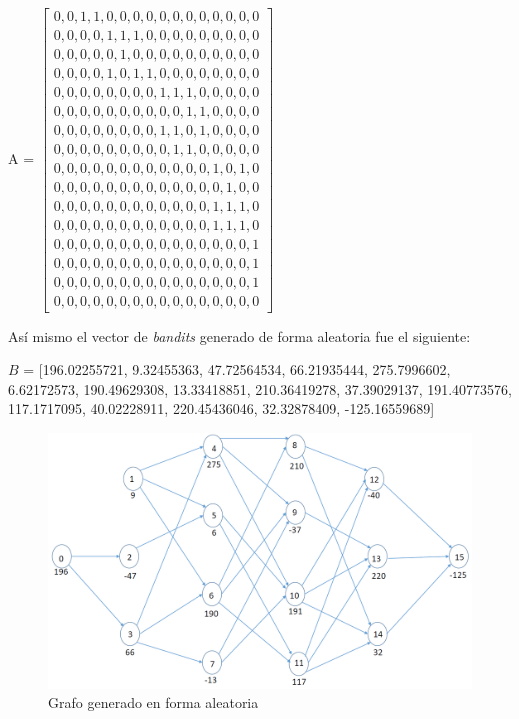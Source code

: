 \renewcommand{\arraystretch}{0.5}
A = 
$\begin{bmatrix}

0, 0, 1, 1,  0,  0,  0,  0,  0,  0,  0, 0, 0, 0, 0, 0\\
0, 0, 0, 0,  1,  1,  1,  0,  0,  0,  0, 0, 0, 0, 0, 0\\
0, 0, 0, 0,  0,  1,  0,  0,  0,  0,  0, 0, 0, 0, 0, 0\\
0, 0, 0, 0,  1,  0,  1,  1,  0,  0,  0, 0, 0, 0, 0, 0\\
0, 0, 0, 0,  0,  0,  0,  0,  1,  1,  1, 0, 0, 0, 0, 0\\
0, 0, 0, 0,  0,  0,  0,  0,  0,  0,  1, 1, 0, 0, 0, 0\\
0, 0, 0, 0,  0,  0,  0,  0,  1,  1,  0, 1, 0, 0, 0, 0\\
0, 0, 0, 0,  0,  0,  0,  0,  0,  1,  1, 0, 0, 0, 0, 0\\
0, 0, 0, 0,  0,  0,  0,  0,  0,  0,  0, 0, 1, 0, 1, 0\\
0, 0, 0, 0,  0,  0,  0,  0,  0,  0,  0, 0, 0, 1, 0, 0\\
0, 0, 0, 0,  0,  0,  0,  0,  0,  0,  0, 0, 1, 1, 1, 0\\
0, 0, 0, 0,  0,  0,  0,  0,  0,  0,  0, 0, 1, 1, 1, 0\\
0, 0, 0, 0,  0,  0,  0,  0,  0,  0,  0, 0, 0, 0, 0, 1\\
0, 0, 0, 0,  0,  0,  0,  0,  0,  0,  0, 0, 0, 0, 0, 1\\
0, 0, 0, 0,  0,  0,  0,  0,  0,  0,  0, 0, 0, 0, 0, 1\\
0, 0, 0, 0,  0,  0,  0,  0,  0,  0,  0, 0, 0, 0, 0, 0
\end{bmatrix}$

Así mismo el vector de \textit{bandits} generado de forma aleatoria fue el siguiente:

$B$ = [196.02255721, 9.32455363, 47.72564534, 66.21935444, 275.7996602, 6.62172573, 190.49629308, 13.33418851, 210.36419278, 37.39029137, 191.40773576, 117.1717095, 40.02228911, 220.45436046, 32.32878409, -125.16559689]

\begin{figure}[H]
	\centering
	\includegraphics[scale=0.4]{GrafoRandom.png}
	\caption{Grafo generado en forma aleatoria}
	\label{graforandom}
\end{figure}

